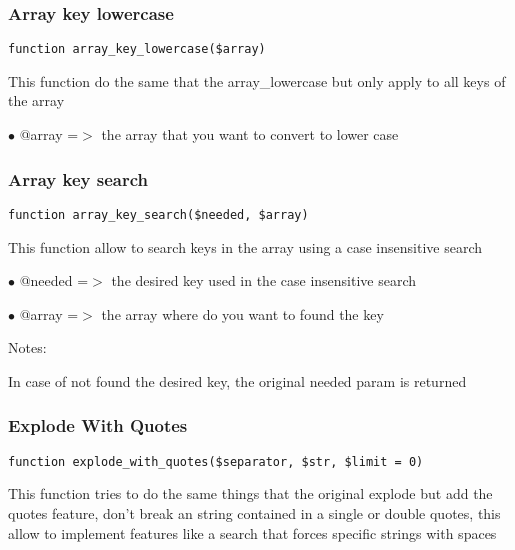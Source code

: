 \documentclass[a4paper]{article}
\begin{document}
\hypertarget{toc69}{}
\subsubsection{Array key lowercase}

\begin{lstlisting}
function array_key_lowercase($array)
\end{lstlisting}

This function do the same that the array\_lowercase but only apply to all
keys of the array

\begin{compactitem}
\item[\color{myblue}$\bullet$] @array =$>$ the array that you want to convert to lower case
\end{compactitem}

\hypertarget{toc70}{}
\subsubsection{Array key search}

\begin{lstlisting}
function array_key_search($needed, $array)
\end{lstlisting}

This function allow to search keys in the array using a case insensitive search

\begin{compactitem}
\item[\color{myblue}$\bullet$] @needed =$>$ the desired key used in the case insensitive search
\item[\color{myblue}$\bullet$] @array  =$>$ the array where do you want to found the key
\end{compactitem}

Notes:

In case of not found the desired key, the original needed param is returned

\hypertarget{toc71}{}
\subsubsection{Explode With Quotes}

\begin{lstlisting}
function explode_with_quotes($separator, $str, $limit = 0)
\end{lstlisting}

This function tries to do the same things that the original explode but add
the quotes feature, don't break an string contained in a single or double
quotes, this allow to implement features like a search that forces specific
strings with spaces
\end{document}
